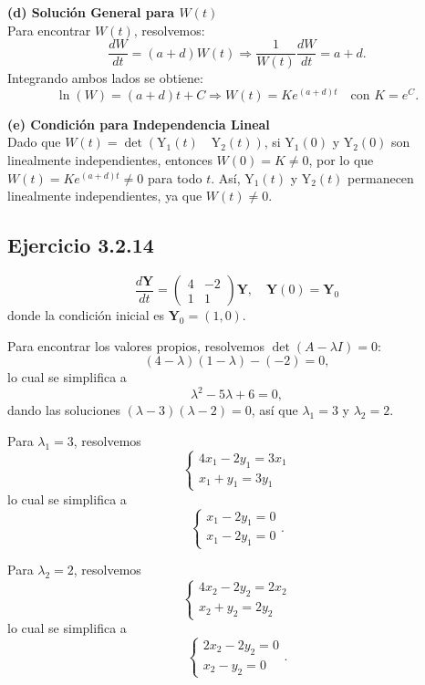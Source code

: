 \documentclass{report}
\begin{document}
    \noindent\textbf{(d) Solución General para $W(t)$} \\
    Para encontrar $W(t)$, resolvemos:
    \[
    \frac{d W}{d t} = (a + d) W(t) \Rightarrow \frac{1}{W(t)} \frac{d W}{d t} = a + d.
    \]
    Integrando ambos lados se obtiene:
    \[
    \ln(W) = (a + d) t + C \Rightarrow W(t) = K e^{(a + d)t} \quad \text{con } K = e^C.
    \]

    \noindent\textbf{(e) Condición para Independencia Lineal} \\
    Dado que $W(t) = \det(\mathrm{Y}_1(t) \quad \mathrm{Y}_2(t))$, si $\mathrm{Y}_1(0)$ y $\mathrm{Y}_2(0)$ son linealmente independientes, entonces $W(0) = K \neq 0$, por lo que $W(t) = K e^{(a + d) t} \neq 0$ para todo $t$. Así, $\mathrm{Y}_1(t)$ y $\mathrm{Y}_2(t)$ permanecen linealmente independientes, ya que $W(t) \neq 0$.

    \subsection*{Ejercicio 3.2.14}

        \[
    \frac{d \mathbf{Y}}{d t}=\begin{pmatrix}4 & -2 \\ 1 & 1\end{pmatrix} \mathbf{Y}, \quad \mathbf{Y}(0)=\mathbf{Y}_0
    \]
    donde la condición inicial es \(\mathbf{Y}_0=(1,0)\).

    Para encontrar los valores propios, resolvemos \(\operatorname{det}(A - \lambda I) = 0\):
    \[
    (4 - \lambda)(1 - \lambda) - (-2) = 0,
    \]
    lo cual se simplifica a
    \[
    \lambda^2 - 5\lambda + 6 = 0,
    \]
    dando las soluciones \((\lambda - 3)(\lambda - 2) = 0\), así que \(\lambda_1 = 3\) y \(\lambda_2 = 2\).

    Para \(\lambda_1 = 3\), resolvemos
    \[
    \begin{cases} 
    4x_1 - 2y_1 = 3x_1 \\
    x_1 + y_1 = 3y_1 
    \end{cases}
    \]
    lo cual se simplifica a
    \[
    \begin{cases}
    x_1 - 2y_1 = 0 \\
    x_1 - 2y_1 = 0
    \end{cases}.
    \]

    Para \(\lambda_2 = 2\), resolvemos
    \[
    \begin{cases} 
    4x_2 - 2y_2 = 2x_2 \\
    x_2 + y_2 = 2y_2 
    \end{cases}
    \]
    lo cual se simplifica a
    \[
    \begin{cases}
    2x_2 - 2y_2 = 0 \\
    x_2 - y_2 = 0
    \end{cases}.
    \]
\end{document}

